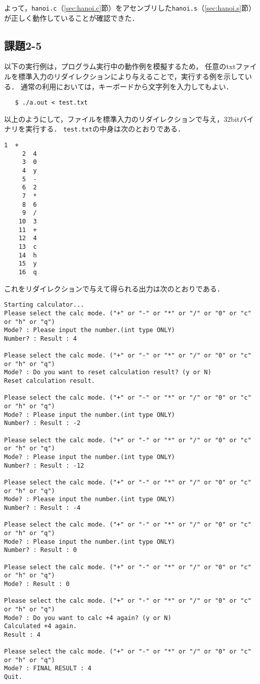 よって，\verb|hanoi.c|（\ref{sec:hanoi.c}節）をアセンブリした\verb|hanoi.s|（\ref{sec:hanoi.s}節）が正しく動作していることが確認できた．

\subsection{課題2-5}
以下の実行例は，プログラム実行中の動作例を模擬するため，
任意のtxtファイルを標準入力のリダイレクションにより与えることで，実行する例を示している．
通常の利用においては，キーボードから文字列を入力してもよい．

{\fontsize{10pt}{11pt} \selectfont
 \begin{verbatim}
   $ ./a.out < test.txt
 \end{verbatim}
}

以上のようにして，ファイルを標準入力のリダイレクションで与え，32bitバイナリを実行する．
\verb|test.txt|の中身は次のとおりである．
\begin{Verbatim}[fontsize=\small, baselinestretch=0.8]
     1	+
     2	4
     3	0
     4	y
     5	-
     6	2
     7	*
     8	6
     9	/
    10	3
    11	+
    12	4
    13	c
    14	h
    15	y
    16	q
\end{Verbatim}

これをリダイレクションで与えて得られる出力は次のとおりである．

\begin{Verbatim}[fontsize=\small, baselinestretch=0.8]
Starting calculator...
Please select the calc mode. ("+" or "-" or "*" or "/" or "0" or "c" or "h" or "q")
Mode? : Please input the number.(int type ONLY)
Number? : Result : 4

Please select the calc mode. ("+" or "-" or "*" or "/" or "0" or "c" or "h" or "q")
Mode? : Do you want to reset calculation result? (y or N)
Reset calculation result.

Please select the calc mode. ("+" or "-" or "*" or "/" or "0" or "c" or "h" or "q")
Mode? : Please input the number.(int type ONLY)
Number? : Result : -2

Please select the calc mode. ("+" or "-" or "*" or "/" or "0" or "c" or "h" or "q")
Mode? : Please input the number.(int type ONLY)
Number? : Result : -12

Please select the calc mode. ("+" or "-" or "*" or "/" or "0" or "c" or "h" or "q")
Mode? : Please input the number.(int type ONLY)
Number? : Result : -4

Please select the calc mode. ("+" or "-" or "*" or "/" or "0" or "c" or "h" or "q")
Mode? : Please input the number.(int type ONLY)
Number? : Result : 0

Please select the calc mode. ("+" or "-" or "*" or "/" or "0" or "c" or "h" or "q")
Mode? : Result : 0

Please select the calc mode. ("+" or "-" or "*" or "/" or "0" or "c" or "h" or "q")
Mode? : Do you want to calc +4 again? (y or N)
Calculated +4 again.
Result : 4

Please select the calc mode. ("+" or "-" or "*" or "/" or "0" or "c" or "h" or "q")
Mode? : FINAL RESULT : 4
Quit.
\end{Verbatim}

